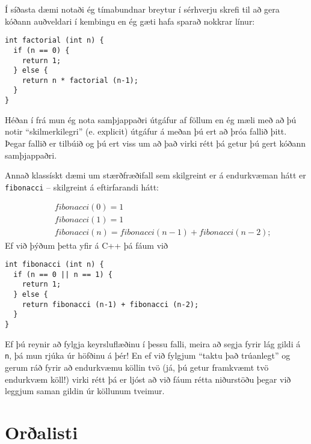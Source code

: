 Í síðasta dæmi notaði ég tímabundnar breytur í sérhverju skrefi til að gera kóðann auðveldari í kembingu en ég gæti hafa sparað nokkrar línur:

\begin{verbatim}
int factorial (int n) {
  if (n == 0) {
    return 1;
  } else {
    return n * factorial (n-1);
  }
}
\end{verbatim}
%
Héðan í frá mun ég nota samþjappaðri útgáfur af föllum en ég mæli með að þú notir ``skilmerkilegri'' (e. explicit) útgáfur á meðan þú ert að þróa fallið þitt.
Þegar fallið er tilbúið og þú ert viss um að það virki rétt þá getur þú gert kóðann samþjappaðri.

Annað klassískt dæmi um stærðfræðifall sem skilgreint er á endurkvæman hátt er {\tt fibonacci} -- skilgreint á eftirfarandi hátt:

\begin{eqnarray*}
&& fibonacci(0) = 1 \\
&& fibonacci(1) = 1 \\
&& fibonacci(n) = fibonacci(n-1) + fibonacci(n-2);
\end{eqnarray*}
%
Ef við þýðum þetta yfir á C++ þá fáum við

\begin{verbatim}
int fibonacci (int n) {
  if (n == 0 || n == 1) {
    return 1;
  } else {
    return fibonacci (n-1) + fibonacci (n-2);
  }
}
\end{verbatim}
%
Ef þú reynir að fylgja keyrsluflæðinu í þessu falli, meira að segja fyrir lág gildi á {\tt n}, þá mun rjúka úr höfðinu á þér!
En ef við fylgjum ``taktu það trúanlegt'' og gerum ráð fyrir að endurkvæmu köllin tvö
(já, þú getur framkvæmt tvö endurkvæm köll!) virki rétt þá er ljóst að við fáum rétta niðurstöðu þegar við leggjum saman gildin úr köllunum tveimur.

\section{Orðalisti}

